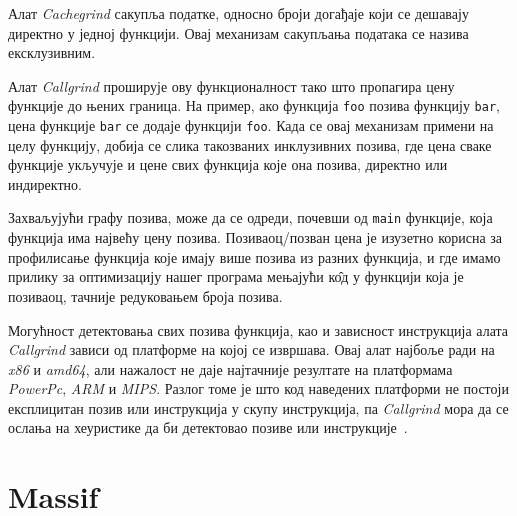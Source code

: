 \documentclass[12pt,oneside]{memoir}
\begin{document}
\indent Алат \textit{Cachegrind} сакупља податке, односно броји догађаје који се дешавају директно у једној функцији. Овај механизам сакупљања података се назива ексклузивним.

\indent Алат \textit{Callgrind} проширује ову функционалност тако што пропагира цену функције до њених граница. На пример, ако функција \texttt{foo} позива функцију \texttt{bar}, цена функције \texttt{bar} се додаје функцији \texttt{foo}. Када се овај механизам примени на целу функцију, добија се слика такозваних инклузивних позива, где цена сваке функције укључује и цене свих функција које она позива, директно или индиректно.

\indent Захваљујући графу позива, може да се одреди, почевши од \texttt{main} функције, која функција има највећу цену позива. Позиваоц/позван цена је изузетно корисна за профилисање функција које имају више позива из разних функција, и где имамо прилику за оптимизацију нашег програма мењајући к\^{о}д у функцији која је позиваоц, тачније редуковањем броја позива.

\indent Могућност детектовања свих позива функција, као и зависност инструкција алата  \textit{Callgrind} зависи од платформе на којој се извршава. Овај алат најбоље ради на \textit{x86} и \textit{amd64}, али нажалост не даје најтачније резултате на платформама \textit{PowerPc}, \textit{ARM} и \textit{MIPS}. Разлог томе је што код наведених платформи не постоји експлицитан позив или инструкција у скупу инструкција, па  \textit{Callgrind} мора да се ослања на хеуристике да би детектовао позиве или инструкције~\cite{callgrindRef}.


\section{Massif}
\label{section_massif}
\end{document}
